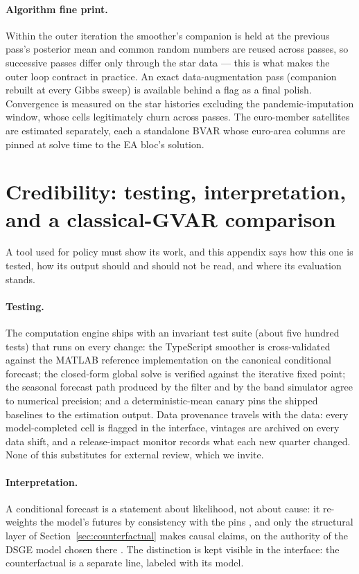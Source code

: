 \documentclass[11pt]{article}
\begin{document}
\paragraph{Algorithm fine print.} Within the outer iteration the smoother's companion is
held at the previous pass's posterior mean and common random numbers are reused across
passes, so successive passes differ only through the star data --- this is what makes the
outer loop contract in practice. An exact data-augmentation pass (companion rebuilt at
every Gibbs sweep) is available behind a flag as a final polish. Convergence is measured on
the star histories excluding the pandemic-imputation window, whose cells legitimately churn
across passes. The \NMembers{} euro-member satellites are estimated separately, each a
standalone BVAR whose euro-area columns are pinned at solve time to the EA bloc's solution.

\section{Credibility: testing, interpretation, and a classical-GVAR comparison}\label{app:cred}

A tool used for policy must show its work, and this appendix says how this one is tested,
how its output should and should not be read, and where its evaluation stands.

\paragraph{Testing.} The computation engine ships with an invariant test suite (about five
hundred tests) that runs on every change: the TypeScript smoother is cross-validated
against the MATLAB reference implementation on the canonical conditional forecast; the
closed-form global solve is verified against the iterative fixed point; the seasonal
forecast path produced by the filter and by the band simulator agree to numerical
precision; and a deterministic-mean canary pins the shipped baselines to the estimation
output. Data provenance travels with the data: every model-completed cell is flagged in
the interface, vintages are archived on every data shift, and a release-impact monitor
records what each new quarter changed. None of this substitutes for external review, which
we invite.

\paragraph{Interpretation.} A conditional forecast is a statement about likelihood, not
about cause: it re-weights the model's futures by consistency with the pins
\citep{WaggonerZha1999}, and only the structural layer of
Section~\ref{sec:counterfactual} makes causal claims, on the authority of the DSGE model
chosen there \citep{AntolinDiazPetrellaRubioRamirez2021}. The distinction is kept visible
in the interface: the counterfactual is a separate line, labeled with its model.
\end{document}

